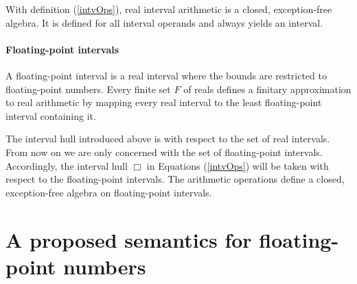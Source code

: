 \documentclass[11pt]{article}
\begin{document}
With definition (\ref{intvOps}), real interval arithmetic is a closed,
exception-free algebra. It is defined for all interval operands and
always yields an interval.

\paragraph{Floating-point intervals}

A floating-point interval is a real interval where the bounds are
restricted to floating-point numbers. Every finite set $F$ of reals
defines a finitary approximation to real arithmetic by mapping every
real interval to the least floating-point interval containing it.

The interval hull introduced above is with respect to the set of real
intervals. From now on we are only concerned with the set of
floating-point intervals. Accordingly, the interval hull $\Box$ in
Equations (\ref{intvOps}) will be taken with respect to the
floating-point intervals. The arithmetic operations define a closed,
exception-free algebra on floating-point intervals.

\section{A proposed semantics for floating-point numbers}
\label{semFlpt}
\end{document}
